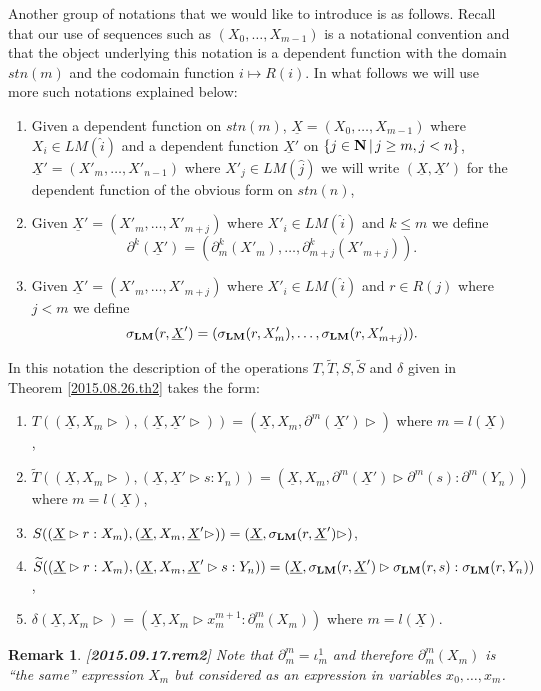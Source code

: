 \documentclass[11pt]{article}
\newtheorem{remark}[proposition]{Remark}
\newcommand{\llabel}[1]{\label{#1}[{\bf #1}]}
\newcommand{\nn}{{\bf N\rm}}
\newcommand{\nat}{\nn}
\newcommand{\lm}{{\bf LM}}
\newcommand{\uu}{\underline}
\newcommand{\wt}{\widetilde}
\newcommand{\wh}{\widehat}
\begin{document}
Another group of notations that we would like to introduce is as follows. Recall that our use of sequences such as $(X_0,\dots,X_{m-1})$ is a notational convention and that the object underlying this notation is a dependent function with the domain $stn(m)$ and the codomain function $i\mapsto R(i)$. In what follows we will use more such notations explained below:
%
\begin{enumerate}
\item Given a dependent function on $stn(m)$, $\uu{X}=(X_0,\dots,X_{m-1})$ where $X_i\in LM(\wh{i})$ and a dependent function $\uu{X}'$ on $\{j\in\nat\,|\, j\ge m, j<n\}$, $\uu{X}'=(X'_m,\dots,X'_{n-1})$ where $X'_j\in LM(\wh{j})$ we will write $(\uu{X},\uu{X}')$ for the dependent function of the obvious form on $stn(n)$,
%
\item Given $\uu{X}'=(X'_m,\dots,X'_{m+j})$ where $X'_i\in LM(\wh{i})$ and $k\le m$ we define 
%
$$\partial^k(\uu{X}')=(\partial^k_m(X'_m),\dots,\partial^k_{m+j}(X'_{m+j})).$$  
%
\item Given $\uu{X}'=(X'_m,\dots,X'_{m+j})$ where $X'_i\in LM(\wh{i})$ and $r\in R(j)$ where $j<m$ we define
%
$$\sigma_{\lm}(r,\uu{X}')=(\sigma_{\lm}(r,X'_m),\dots,\sigma_{\lm}(r,X'_{m+j})).$$
%
\end{enumerate}
%
In this notation the description of the operations $T,\wt{T},S,\wt{S}$ and $\delta$  given in Theorem \ref{2015.08.26.th2} takes the form:
%
\begin{enumerate}
\item $T((\uu{X},X_m\rhd),(\uu{X},\uu{X}'\rhd))=(\uu{X},X_m,\partial^m(\uu{X}')\rhd)$ where $m=l(\uu{X})$,
\item $\wt{T}((\uu{X},X_m\rhd),(\uu{X},\uu{X}'\rhd s:Y_n))=(\uu{X},X_m,\partial^m(\uu{X}')\rhd \partial^m(s):\partial^m(Y_n))$ where $m=l(\uu{X})$,
\item $S((\uu{X}\rhd r:X_m),(\uu{X},X_m,\uu{X}'\rhd))=(\uu{X},\sigma_{\lm}(r,\uu{X}')\rhd)$,
\item $\wt{S}((\uu{X}\rhd r:X_m),(\uu{X},X_m,\uu{X}'\rhd s:Y_n))=(\uu{X},\sigma_{\lm}(r,\uu{X}')\rhd \sigma_{\lm}(r,s):\sigma_{\lm}(r,Y_n))$,
\item $\delta(\uu{X},X_m\rhd)=(\uu{X},X_m\rhd x^{m+1}_m:\partial_m^m(X_m))$ where $m=l(\uu{X})$.
\end{enumerate}
%
\begin{remark}\rm
\llabel{2015.09.17.rem2}
Note that $\partial_m^m=\iota_m^1$ and therefore $\partial_m^m(X_m)$ is ``the same'' expression $X_m$ but considered as an expression in variables $x_0,\dots,x_m$. 
\end{remark}
% 
\end{document}
